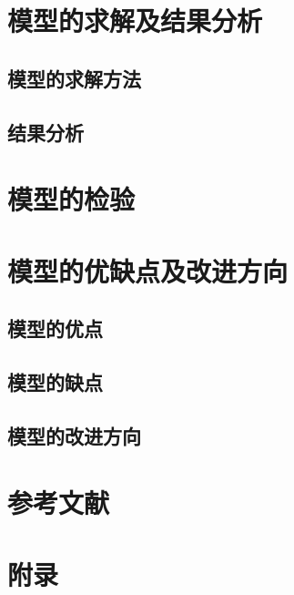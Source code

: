 \documentclass[UTF8]{ctexart}
\begin{document}
\section{模型的求解及结果分析}
\subsection{模型的求解方法}
\subsection{结果分析}
\section{模型的检验}
\section{模型的优缺点及改进方向}
\subsection{模型的优点}
\subsection{模型的缺点}
\subsection{模型的改进方向}
\section{参考文献}
\section{附录}
\end{document}
